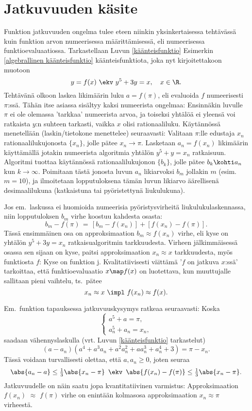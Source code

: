 \section{Jatkuvuuden käsite} \label{jatkuvuuden käsite}
\alku

Funktion jatkuvuuden ongelma tulee eteen niinkin yksinkertaisessa tehtävässä kuin funktion
arvon numeerisessa määrittämisessä, eli numeerisessa funktioevaluaatiossa. Tarkastellaan Luvun 
\ref{käänteisfunktio} Esimerkin \ref{algebrallinen käänteisfunktio} käänteisfunktiota, 
joka nyt kirjoitettakoon muotoon
\[
y=f(x) \ \ekv \ y^5+3y=x, \quad x\in\R.
\]
Tehtävänä olkoon laskea likimäärin luku $a=f(\pi)$, eli evaluoida $f$ numeerisesti $\pi$:ssä. 
Tähän itse asiassa sisältyy kaksi numeerista ongelmaa: Ensinnäkin luvulle $\pi$ ei ole olemassa
'tarkkaa' numeerista arvoa, ja toiseksi yhtälöä ei yleensä voi ratkaista $y$:n suhteen
tarkasti, vaikka $x$ olisi rationaaliluku. Käytännössä menetellään (laskin/tietokone 
menettelee) seuraavasti: Valitaan $\pi$:lle edustaja $x_n$ rationaalilukujonosta $\{x_n\}$,
jolle pätee $x_n\rightarrow \pi$. Lasketaan $a_n=f(x_n)$ likimäärin käyttämällä jotakin
numeerista algoritmia yhtälön $y^5+y=x_n$ ratkaisuun. Algoritmi tuottaa käytännössä
rationaalilukujonon $\{b_k\}$, jolle pätee $b_k \kohti a_n$ kun $k\rightarrow\infty$. Poimitaan
tästä jonosta luvun $a_n$ likiarvoksi $b_m$ jollakin $m$ (esim.\ $m=10$), ja ilmoitetaan
lopputuloksena tämän luvun likiarvo äärellisenä desimaalilukuna (katkaistuna tai pyöristettynä
liukulukuna). 

Jos em.\ laskussa ei huomioida numeerisia pyöristysvirheitä liukulukulaskennassa, niin 
lopputuloksen $b_m$ virhe koostuu kahdesta osasta:
\[
b_m-f(\pi)\,=\,[b_m-f(x_n)]+[f(x_n)-f(\pi)].
\]
Tässä ensimmäinen osa on approksimaation $b_m \approx f(x_n)$ virhe, eli kyse on yhtälön
$y^5+3y=x_n$ ratkaisualgoritmin tarkkuudesta. Virheen jälkimmäisessä osassa sen sijaan on kyse,
paitsi approksimaation $x_n \approx x$ tarkkuudesta, myös funktiosta $f$: Kyse on funktion 
j. Kvalitatiivisesti väittämä '$f$ on jatkuva $x$:ssä' tarkoittaa, että
funktioevaluaatio $x \map f(x)$ on luotettava, kun muuttujalle sallitaan pieni vaihtelu, ts.\
pätee
\[
x_n\approx x \ \impl \ f(x_n)\approx f(x).
\]

Em.\ funktion tapauksessa jatkuvuuskysymys ratkeaa seuraavasti: Koska
\[
\begin{cases}
a^5+a=\pi, \\
a_n^5+a_n=x_n,
\end{cases}
\]
saadaan vähennyslaskulla (vrt. Luvun \ref{käänteisfunktio} tarkastelut)
\[
(a-a_n)(a^4+a^3a_n+a^2a_n^2+aa_n^3+a_n^4+3)=\pi-x_n.
\]
Tässä voidaan turvallisesti olettaa, että $a,a_n \ge 0$, joten seuraa
\[
\abs{a_n-a}\le \tfrac{1}{3}\abs{x_n-\pi}\,\ \ekv\,\ 
\abs{f(x_n)-f(\pi)}\le\tfrac{1}{3}\abs{x_n-\pi}.
\]
Jatkuvuudelle on näin saatu jopa kvantitatiivinen varmistus: Approksimaation $f(x_n)$ $\approx$
$f(\pi)$ virhe on enintään kolmasosa approksimaation $x_n\approx \pi$ virheestä. 

